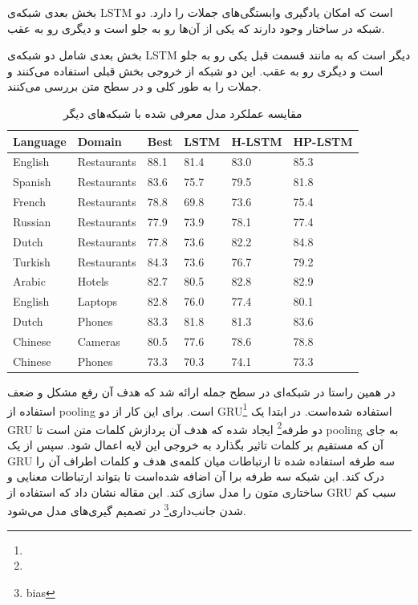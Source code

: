 \documentclass[12pt, a4paper, oneside]{report}
\begin{document}
بخش بعدی شبکه‌ی
LSTM
است که امکان یادگیری وابستگی‌های جملات را دارد. دو شبکه‌ در ساختار وجود دارند که یکی از آن‌ها
رو به جلو است و دیگری رو به عقب.

بخش بعدی شامل دو شبکه‌ی
LSTM
دیگر است که به مانند قسمت قبل یکی رو به جلو است و دیگری رو به عقب. این دو شبکه از خروجی بخش قبلی
استفاده می‌کنند و جملات را به طور کلی و در سطح متن بررسی می‌کنند.

\begin{table}[!ht]
    \begin{small}
    \begin{center}
      \begin{latin}
      \begin{tabular}{|l|l|l|l|l|l|}
        \hline
        Language & Domain & Best & LSTM & H-LSTM &  HP-LSTM \\
        \hline
        English & Restaurants & 88.1 & 81.4 & 83.0 & 85.3 \\
        \hline
        Spanish & Restaurants & 83.6 & 75.7 & 79.5 & 81.8 \\
        \hline
        French & Restaurants & 78.8 & 69.8 & 73.6 & 75.4 \\
        \hline
        Russian & Restaurants & 77.9 & 73.9 & 78.1 & 77.4 \\
        \hline
        Dutch & Restaurants & 77.8 & 73.6 & 82.2 & 84.8 \\
        \hline
        Turkish & Restaurants & 84.3 & 73.6 & 76.7 & 79.2 \\
        \hline
        Arabic & Hotels & 82.7 & 80.5 & 82.8 & 82.9 \\
        \hline
        English & Laptops & 82.8 & 76.0 & 77.4 & 80.1 \\
        \hline
        Dutch & Phones & 83.3 & 81.8 & 81.3 & 83.6 \\
        \hline
        Chinese & Cameras & 80.5 & 77.6 & 78.6 & 78.8 \\
        \hline
        Chinese & Phones & 73.3 & 70.3 & 74.1 & 73.3 \\
        \hline
      \end{tabular}
      \end{latin}
      \caption{مقایسه عملکرد مدل معرفی شده با شبکه‌های دیگر}
      \label{tab:H-LSTM}
    \end{center}
\end{small}
  \end{table}

در همین راستا در
\cite{72Zhang_Zhang_Vo_2016}
شبکه‌ای در سطح جمله ارائه شد که هدف آن رفع مشکل و ضعف استفاده از
pooling
است. برای این کار از دو
GRU\footnote{}
استفاده شده‌است. در ابتدا یک
GRU
دو طرفه\footnote{}
ایجاد شده که هدف آن پردازش کلمات متن است تا
pooling
به جای آن که مستقیم بر کلمات تاثیر بگذارد به خروجی این لایه اعمال شود. سپس از یک
GRU
سه طرفه استفاده شده تا ارتباطات میان کلمه‌ی هدف و کلمات اطراف آن را درک کند.
این شبکه سه طرفه برا آن اضافه شده‌است تا بتواند ارتباطات معنایی و ساختاری متون را مدل سازی کند.
این مقاله نشان داد که استفاده از
GRU
سبب کم شدن جانب‌داری\footnote{bias}
در تصمیم گیری‌های مدل می‌شود.
\end{document}

